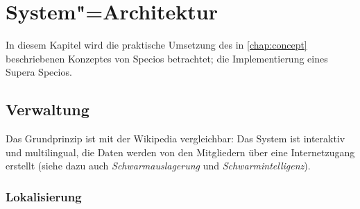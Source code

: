 \chapter{System"=Architektur}\label{chap:architecture}

In diesem Kapitel wird die praktische Umsetzung des in \vref{chap:concept} beschriebenen Konzeptes von Specios betrachtet; die Implementierung eines Supera Specios.

\section{Verwaltung}\label{sec:maintenance}

Das Grundprinzip ist mit der Wikipedia vergleichbar: Das System ist interaktiv und multilingual, die Daten werden von den Mitgliedern über eine Internetzugang erstellt (siehe dazu auch \textit{Schwarmauslagerung} und \textit{Schwarmintelligenz}).

\subsection{Lokalisierung}\label{sec:maintenance/localization}


